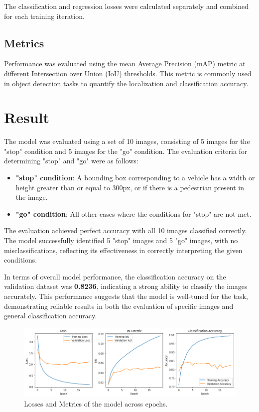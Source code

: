\documentclass[10pt,twocolumn,letterpaper]{article}
\begin{document}
The classification and regression losses were calculated separately and combined for each training iteration.

\subsection{Metrics}
Performance was evaluated using the mean Average Precision (mAP) metric at different Intersection over Union (IoU) thresholds. This metric is commonly used in object detection tasks to quantify the localization and classification accuracy.


\section{Result}

The model was evaluated using a set of 10 images, consisting of 5 images for the "stop" condition and 5 images for the "go" condition. The evaluation criteria for determining "stop" and "go" were as follows:

\begin{itemize}
    \item \textbf{"stop" condition}: 
    A bounding box corresponding to a vehicle has a width or height greater than or equal to 300px, or if there is a pedestrian present in the image.
    \item \textbf{"go" condition}: 
    All other cases where the conditions for "stop" are not met.
\end{itemize}

The evaluation achieved perfect accuracy with all 10 images classified correctly. The model successfully identified 5 "stop" images and 5 "go" images, with no misclassifications, reflecting its effectiveness in correctly interpreting the given conditions.

In terms of overall model performance, the classification accuracy on the validation dataset was \textbf{0.8236}, indicating a strong ability to classify the images accurately. This performance suggests that the model is well-tuned for the task, demonstrating reliable results in both the evaluation of specific images and general classification accuracy.

\begin{figure}[h]
    \centering
    \includegraphics[width=0.8\linewidth]{graph.png}
    \caption{Losses and Metrics of the model across epochs.}
    \label{fig:graph}
\end{figure}
\end{document}
